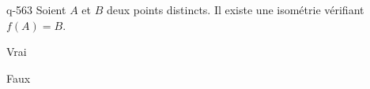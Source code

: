 \begin{truefalse}{q-563}
Soient $A$ et $B$ deux points distincts. Il existe une isométrie vérifiant $f(A)=B$.
\item* Vrai
\item Faux
\end{truefalse}

